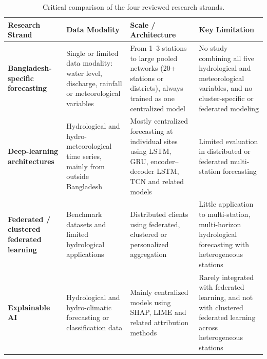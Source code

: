\vspace{-0.3cm}
\begin{table}[htbp]
\centering
\caption{Critical comparison of the four reviewed research strands.}
\label{tab:lit-comparison}
\small
\setlength{\tabcolsep}{4pt}
\renewcommand{\arraystretch}{1.25}

\begin{tabularx}{\textwidth}{
    >{\raggedright\arraybackslash}p{3.0cm}
    >{\raggedright\arraybackslash}X
    >{\raggedright\arraybackslash}X
    >{\raggedright\arraybackslash}X
}
\toprule
\textbf{Research Strand} &
\textbf{Data Modality} &
\textbf{Scale / Architecture} &
\textbf{Key Limitation} \\
\midrule

\textbf{Bangladesh-specific forecasting}
\cite{Islam2026a,Islam2026b,Ruma2023,Rakin2023,Rajab2023,HemelSakib2024,Hossain2025}
&
Single or limited data modality: water level, discharge, rainfall or meteorological variables
&
From 1--3 stations to large pooled networks (20+ stations or districts), always trained as one centralized model
&
No study combining all five hydrological and meteorological variables, and no cluster-specific or federated modeling
\\[0.8em]

\textbf{Deep-learning architectures}
\cite{Kao2020,Cui2022,Lim2025,Yuan2023,Ni2024,Kumar2023,Hameed2025,Waqas2024,Aghenda2025,Li2024,Lin2021,Li2025}
&
Hydrological and hydro-meteorological time series, mainly from outside Bangladesh
&
Mostly centralized forecasting at individual sites using LSTM, GRU, encoder--decoder LSTM, TCN and related models
&
Limited evaluation in distributed or federated multi-station forecasting
\\[0.8em]

\textbf{Federated / clustered federated learning}
\cite{McMahan2017,Zhu2021,Chen2025,Ghosh2021,Harshvardhan2022,BenAli2026,Amanzholova2026,Mahir2025}
&
Benchmark datasets and limited hydrological applications
&
Distributed clients using federated, clustered or personalized aggregation
&
Little application to multi-station, multi-horizon hydrological forecasting with heterogeneous stations
\\[0.8em]

\textbf{Explainable AI}
\cite{Lundberg2017,Huang2024,Khorrami2025,Parasar2025,Mahir2025}
&
Hydrological and hydro-climatic forecasting or classification data
&
Mainly centralized models using SHAP, LIME and related attribution methods
&
Rarely integrated with federated learning, and not with clustered federated learning across heterogeneous stations
\\

\bottomrule
\end{tabularx}
\end{table}
\vspace{-0.3cm}

